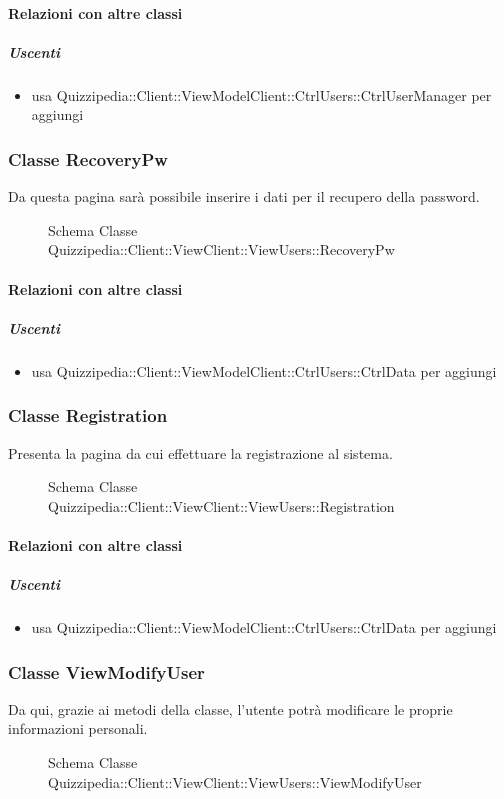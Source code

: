 \paragraph{Relazioni con altre classi}
\subparagraph{Uscenti}
\begin{itemize}
\item usa Quizzipedia::Client::ViewModelClient::CtrlUsers::CtrlUserManager per aggiungi
\end{itemize}
\subsubsection{Classe RecoveryPw}
Da questa pagina sarà possibile inserire i dati per il recupero della password.
\begin{figure}[H]
\centering
\noindent{}
\caption[Schema Classe RecoveryPw]{Schema Classe Quizzipedia::Client::ViewClient::ViewUsers::RecoveryPw}
\end{figure}
\paragraph{Relazioni con altre classi}
\subparagraph{Uscenti}
\begin{itemize}
\item usa Quizzipedia::Client::ViewModelClient::CtrlUsers::CtrlData per aggiungi
\end{itemize}
\subsubsection{Classe Registration}
Presenta la pagina da cui effettuare la  registrazione al sistema.
\begin{figure}[H]
\centering
\noindent{}
\caption[Schema Classe Registration]{Schema Classe Quizzipedia::Client::ViewClient::ViewUsers::Registration}
\end{figure}
\paragraph{Relazioni con altre classi}
\subparagraph{Uscenti}
\begin{itemize}
\item usa Quizzipedia::Client::ViewModelClient::CtrlUsers::CtrlData per aggiungi
\end{itemize}
\subsubsection{Classe ViewModifyUser}
Da qui, grazie ai metodi della classe, l'utente potrà modificare le proprie informazioni personali.
\begin{figure}[H]
\centering
\noindent{}
\caption[Schema Classe ViewModifyUser]{Schema Classe Quizzipedia::Client::ViewClient::ViewUsers::ViewModifyUser}
\end{figure}
